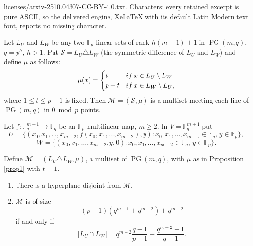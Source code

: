 \documentclass[10pt,a4paper]{amsart}
\DeclareMathOperator{\PG}{{PG}}
\newcommand{\F}{{\mathbb F}}
\newcommand{\cM}{{\mathcal M}}
\newcommand{\cS}{{\mathcal S}}
\begin{document}
licenses/arxiv-2510.04307-CC-BY-4.0.txt. Characters: every retained excerpt is pure ASCII, so the delivered engine, XeLaTeX with its default Latin Modern text font, reports no missing character.
\begin{proposition}
	\label{prop1}
	Let $L_U$ and $L_W$ be any two $\F_p$-linear sets of rank $h(m-1)+1$ in $\PG(m,q)$, $q=p^h$, $h>1$. Put $\cS=L_U \triangle L_W$ (the symmetric difference of $L_U$ and $L_W$) and define $\mu$ as follows:
	\begin{equation}\label{value}
		\mu(x)=
		\begin{cases}
			t & \textnormal{if} \, x \in L_U \setminus L_W\\ 
			p-t & \textnormal{if} \, x\in L_W\setminus L_U,
		\end{cases}
	\end{equation}
	where $1 \leq t \leq p-1$ is fixed. Then $\cM=(\cS,\mu)$ is a multiset meeting each line of $\PG(m,q)$ in $0 \bmod p$ points.
\end{proposition}

\begin{proposition}
	\label{prop2}
	Let $f\colon \F_q^{m-1}\rightarrow \F_q$ be an $\F_p$-multilinear map, $m \geq 2$. In $V= \F_q^{m+1}$ put
	\begin{equation} \label{U}
		U=\{ (x_0,x_1,\ldots,x_{m-2},f(x_0,x_1,\ldots,x_{m-2}),y) \colon x_0,x_1,\ldots,x_{m-2} \in \F_q,\, y\in \F_p \},
	\end{equation}
	\begin{equation}\label{W} 
		W=\{(x_0,x_1,\ldots,x_{m-2},y,0)\colon x_0,x_1,\ldots,x_{m-2}\in \F_q, \, y\in \F_p\}.     
	\end{equation}
	
	Define $\cM=(L_U \triangle L_W,\mu)$, a multiset of $\PG(m,q)$, with $\mu$ as in Proposition \ref{prop1} with $t=1$.
	\begin{enumerate}[\rm(1)]
		\item There is a hyperplane disjoint from $\cM$.
		\item $\cM$ is of size
		\[(p-1)(q^{m-1}+q^{m-2})+q^{m-2}\]
		if and only if 
		\[|L_U \cap L_W|=q^{m-2}\frac{q-1}{p-1}+\frac{q^{m-2}-1}{q-1}. \]
		
	\end{enumerate}
\end{proposition}
\end{document}
